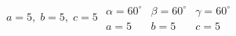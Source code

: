 { $a = 5, \; b = 5, \; c = 5$}
{ $\begin{array}{lll}\alpha = 60^{\circ} & \beta = 60^{\circ} & \gamma = 60^{\circ} \\a = 5 & b = 5 & c = 5 \end{array}$}

